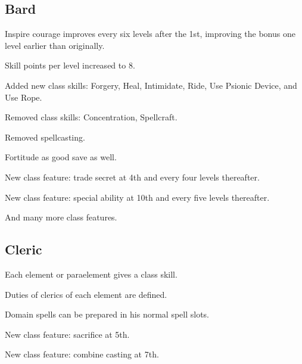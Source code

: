 \subsection{Bard}
\begin{itemize*}
\item Inspire courage improves every six levels after the 1st, improving the bonus one level earlier than originally.
\item Skill points per level increased to 8.
\item Added new class skills: Forgery, Heal, Intimidate, Ride, Use Psionic Device, and Use Rope.
\item Removed class skills: Concentration, Spellcraft.
\item Removed spellcasting.
\item Fortitude as good save as well.
\item New class feature: trade secret at 4th and every four levels thereafter.
\item New class feature: special ability at 10th and every five levels thereafter.
\item And many more class features.
\end{itemize*}

\subsection{Cleric}
\begin{itemize*}
\item Each element or paraelement gives a class skill.
\item Duties of clerics of each element are defined.
\item Domain spells can be prepared in his normal spell slots.
\item New class feature: sacrifice at 5th.
\item New class feature: combine casting at 7th.
\end{itemize*}


